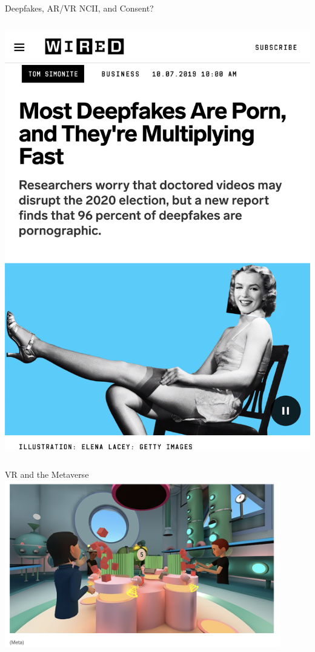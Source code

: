 \documentclass[nobackground,dvipsnames,table,aspectratio=169]{beamer}
\begin{document}
\begin{frame}{Deepfakes, AR/VR NCII, and Consent?}
\begin{columns}
            \includegraphics[width=\textwidth]{deepfakes-2}
    \end{columns}
\end{frame}

\begin{frame}{VR and the Metaverse}
    \centering
    \includegraphics[width=0.9\textwidth]{metaverse}
\end{frame}
\end{document}

